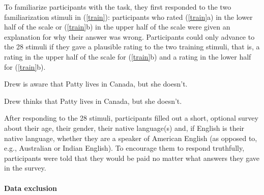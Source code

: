 \documentclass[11pt,fleqn]{article}
\newcommand{\6}{\mbox{$[\hspace*{-.6mm}[$}}
\newcommand{\9}{\mbox{$]\hspace*{-.6mm}]$}}
\begin{document}
{To familiarize participants with the task, they first responded to the two familiarization stimuli in (\ref{train}): participants who rated (\ref{train}a) in the lower half of the scale or (\ref{train}b) in the upper half of the scale were given an explanation for why their answer was wrong. Participants could only advance to the 28 stimuli if they gave a plausible rating to the two training stimuli, that is, a rating in the upper half of the scale for (\ref{train}b) and a rating in the lower half for (\ref{train}b).

\begin{exe}
\ex\label{train}
\begin{xlist}
\ex Drew is aware that Patty lives in Canada, but she doesn't.

\ex Drew thinks that Patty lives in Canada, but she doesn't.
\end{xlist}
\end{exe}

After responding to the 28 stimuli, participants filled out a short, optional survey about their age, their gender, their native language(s) and, if English is their native language, whether they are a speaker of American English (as opposed to, e.g., Australian or Indian English). To encourage them to respond truthfully, participants were told that they would be paid no matter what answers they gave in the survey.

\paragraph{Data exclusion}

}
\end{document}
